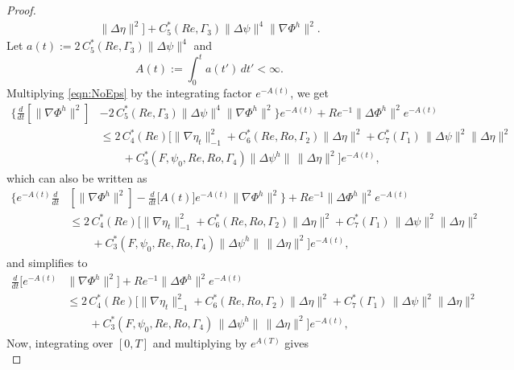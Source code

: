 \begin{proof}
\begin{equation}
\begin{split}
        \|\Delta \eta\|^2\biggr] + C^*_5(Re,\Gamma_3) \|\Delta \psi\|^4 \|\nabla \Phi^h\|^2.
    \end{split}
    \label{eqn:NoEps}
  \end{equation}
  Let $a(t):= 2\,C^*_5(Re,\Gamma_3) \|\Delta \psi\|^4$ and
  \begin{equation}
    A(t) := \int_{0}^{t}\! a(t')\, dt' < \infty.
    \label{eqn:L4Bound}
  \end{equation}
  Multiplying \eqref{eqn:NoEps} by the integrating factor $e^{-A(t)}$, we get
  \begin{align*}
    \biggl\{ \frac{d}{dt}\left[\|\nabla \Phi^h\|^2\right]
      &- 2\, C^*_5(Re,\Gamma_3) \|\Delta \psi\|^4 \|\nabla \Phi^h\|^2\biggr\} e^{-A(t)}
        + Re^{-1} \|\Delta \Phi^h\|^2 e^{-A(t)} \\
      & \le 2\, C^*_4(Re) \biggl[\|\nabla \eta_t\|_{-1}^2
        + C^*_6(Re,Ro,\Gamma_2) \|\Delta \eta\|^2 + C^*_7(\Gamma_1)\,
        \|\Delta \psi\|^2 \|\Delta \eta\|^2 \\
      & \qquad+ C^*_3(F,\psi_0,Re,Ro,\Gamma_4) \|\Delta \psi^h\|\, \|\Delta
        \eta\|^2\biggr] e^{-A(t)},
  \end{align*}
  which can also be written as
  \begin{align*}
    \biggl\{ e^{-A(t)}\frac{d}{dt}
      & \left[\|\nabla \Phi^h\|^2\right]
      - \frac{d}{dt}\bigl[ A(t)\bigr] e^{-A(t)} \|\nabla \Phi^h\|^2\biggr\}
      + Re^{-1} \|\Delta \Phi^h\|^2 e^{-A(t)} \\
    & \le 2\,C^*_4(Re) \biggl[\|\nabla \eta_t\|_{-1}^2
      + C^*_6(Re,Ro,\Gamma_2) \|\Delta \eta\|^2 + C^*_7(\Gamma_1)\,
      \|\Delta \psi\|^2 \|\Delta \eta\|^2 \\
    &\qquad + C^*_3(F,\psi_0,Re,Ro,\Gamma_4) \|\Delta \psi^h\|\, \|\Delta
      \eta\|^2\biggr] e^{-A(t)},
  \end{align*}
  and simplifies to
  \begin{align*}
    \frac{d}{dt}\bigl[e^{-A(t)} &\|\nabla \Phi^h\|^2\bigr]
      + Re^{-1} \|\Delta \Phi^h\|^2 e^{-A(t)} \\
    & \le 2\, C^*_4(Re) \biggl[\|\nabla \eta_t\|_{-1}^2
      + C^*_6(Re,Ro,\Gamma_2) \|\Delta \eta\|^2 + C^*_7(\Gamma_1)\,
      \|\Delta \psi\|^2 \|\Delta \eta\|^2 \\
    &\qquad + C^*_3(F,\psi_0,Re,Ro,\Gamma_4)\, \|\Delta \psi^h\|\,
      \|\Delta \eta\|^2\biggr] e^{-A(t)},
  \end{align*}
  Now, integrating over $[0,T]$ and multiplying by $e^{A(T)}$ gives
  \begin{equation}

\end{equation}
\end{proof}
